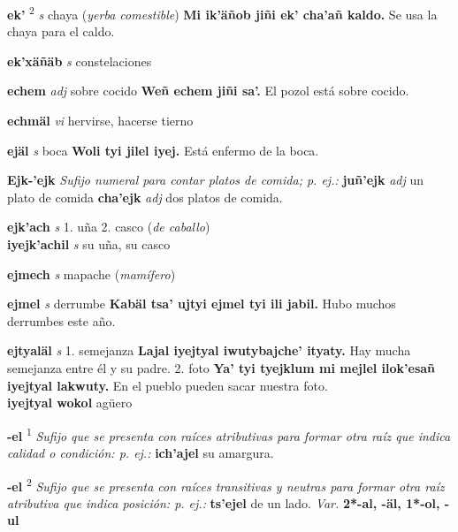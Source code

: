 \documentclass[10pt]{scrbook}
\newcommand{\entry}[1]{\textbf{#1}}
\newcommand{\onedefinition}[1]{#1.}
\newcommand{\defsuperscript}[1]{\textsuperscript{#1}}
\newcommand{\nontranslationdef}[1]{\textit{#1}}
\newcommand{\partofspeech}[1]{\textit{#1}}
\newcommand{\spanishtranslation}[1]{#1}
\newcommand{\clarification}[1]{(\textit{#1})}
\newcommand{\cholexample}[1]{\textbf{#1}}
\newcommand{\exampletranslation}[1]{#1}
\newcommand{\secondaryentry}[1]{\\\textbf{#1}}
\newcommand{\secondpartofspeech}[1]{\textit{#1}}
\newcommand{\secondtranslation}[1]{#1}
\newcommand{\variation}[1]{\textit{Var.} \textbf{#1}}
\begin{document}
\begin{multicols}{2}
\entry{ek'}
\defsuperscript{2}
\partofspeech{s}
\spanishtranslation{chaya}
\clarification{yerba comestible}
\cholexample{Mi ik'äñob jiñi ek' cha'añ kaldo.}
\exampletranslation{Se usa la chaya para el caldo.}

\entry{ek'xäñäb}
\partofspeech{s}
\spanishtranslation{constelaciones}

\entry{echem}
\partofspeech{adj}
\spanishtranslation{sobre cocido}
\cholexample{Weñ echem jiñi sa'.}
\exampletranslation{El pozol está sobre cocido.}

\entry{echmäl}
\partofspeech{vi}
\spanishtranslation{hervirse, hacerse tierno}

\entry{ejäl}
\partofspeech{s}
\spanishtranslation{boca}
\cholexample{Woli tyi jilel iyej.}
\exampletranslation{Está enfermo de la boca.}

\entry{Ejk-'ejk}
\nontranslationdef{Sufijo numeral para contar platos de comida; p. ej.:}
\cholexample{juñ'ejk}
\secondpartofspeech{adj}
\exampletranslation{un plato de comida}
\cholexample{cha'ejk}
\secondpartofspeech{adj}
\secondtranslation{dos platos de comida.}

\entry{ejk'ach}
\partofspeech{s}
\onedefinition{1}
\spanishtranslation{uña}
\onedefinition{2}
\spanishtranslation{casco}
\clarification{de caballo}
\secondaryentry{iyejk'achil}
\secondpartofspeech{s}
\secondtranslation{su uña, su casco}

\entry{ejmech}
\partofspeech{s}
\spanishtranslation{mapache}
\clarification{mamífero}

\entry{ejmel}
\partofspeech{s}
\spanishtranslation{derrumbe}
\cholexample{Kabäl tsa' ujtyi ejmel tyi ili jabil.}
\exampletranslation{Hubo muchos derrumbes este año.}

\entry{ejtyaläl}
\partofspeech{s}
\onedefinition{1}
\spanishtranslation{semejanza}
\cholexample{Lajal iyejtyal iwutybajche' ityaty.}
\exampletranslation{Hay mucha semejanza entre él y su padre.}
\onedefinition{2}
\spanishtranslation{foto}
\cholexample{Ya' tyi tyejklum mi mejlel ilok'esañ iyejtyal lakwuty.}
\exampletranslation{En el pueblo pueden sacar nuestra foto.}
\secondaryentry{iyejtyal wokol}
\secondtranslation{agüero}

\entry{-el}
\defsuperscript{1}
\nontranslationdef{Sufijo que se presenta con raíces atributivas para formar otra raíz que indica calidad o condición: p. ej.:}
\cholexample{ich'ajel}
\exampletranslation{su amargura.}

\entry{-el}
\defsuperscript{2}
\nontranslationdef{Sufijo que se presenta con raíces transitivas y neutras para formar otra raíz atributiva que indica posición: p. ej.:}
\cholexample{ts'ejel}
\exampletranslation{de un lado.}
\variation{2*-al, -äl, 1*-ol, -ul}


\end{multicols}
\end{document}
